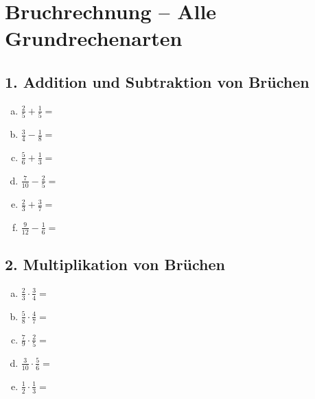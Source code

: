 
\section*{Bruchrechnung – Alle Grundrechenarten}

\subsection*{1. Addition und Subtraktion von Brüchen}
\begin{multicols}{2}
\begin{enumerate}[a)]
    \item $\displaystyle \frac{2}{5} + \frac{1}{5} =$
    \item $\displaystyle \frac{3}{4} - \frac{1}{8} =$
    \item $\displaystyle \frac{5}{6} + \frac{1}{3} =$
    \item $\displaystyle \frac{7}{10} - \frac{2}{5} =$
    \item $\displaystyle \frac{2}{3} + \frac{3}{7} =$
    \item $\displaystyle \frac{9}{12} - \frac{1}{6} =$
\end{enumerate}
\end{multicols}

\vspace{0.5cm}

\subsection*{2. Multiplikation von Brüchen}
\begin{multicols}{2}
\begin{enumerate}[a)]
    \item $\displaystyle \frac{2}{3} \cdot \frac{3}{4} =$
    \item $\displaystyle \frac{5}{8} \cdot \frac{4}{7} =$
    \item $\displaystyle \frac{7}{9} \cdot \frac{2}{5} =$
    \item $\displaystyle \frac{3}{10} \cdot \frac{5}{6} =$
    \item $\displaystyle \frac{1}{2} \cdot \frac{1}{3} =$
\end{enumerate}
\end{multicols}

\vspace{0.5cm}


